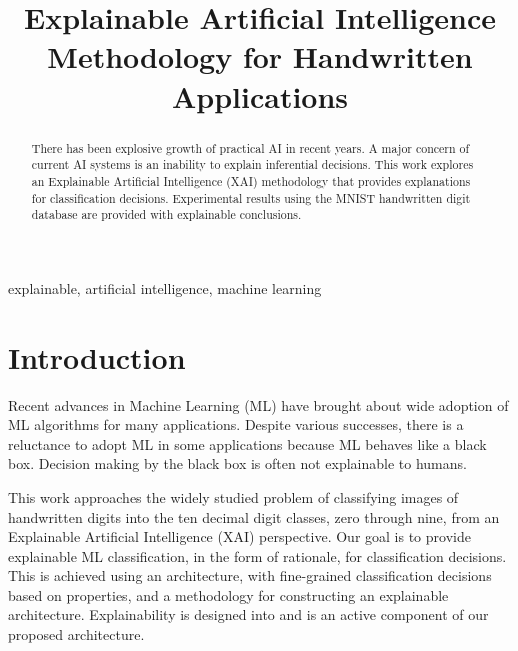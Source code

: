 \documentclass[conference]{IEEEtran}
\begin{document}
\title{Explainable Artificial Intelligence \\ {Methodology for Handwritten Applications}}

\author{

}

\maketitle

\begin{abstract}
There has been explosive growth of practical AI in recent years.
A major concern of current AI systems is an inability to explain inferential decisions.
This work explores an Explainable Artificial Intelligence (XAI) methodology that provides explanations
for classification decisions.  Experimental results using the MNIST handwritten digit database are provided with explainable conclusions.
\end{abstract}

\begin{IEEEkeywords}
explainable, artificial intelligence, machine learning
\end{IEEEkeywords}

\section{Introduction}

Recent advances in Machine Learning (ML) have brought about wide adoption of ML algorithms for many applications.  Despite various successes, there is a reluctance to adopt ML in some applications because ML behaves like a black box.  Decision making by the black box is often not explainable to humans. 

This work approaches the widely studied problem of classifying images of handwritten digits into the ten decimal digit classes, zero through nine, from an Explainable Artificial Intelligence (XAI) perspective.  Our goal is to provide explainable ML classification, in the form of rationale, for classification decisions.  This is achieved using an architecture, with fine-grained classification decisions based on properties, and a methodology for constructing an explainable architecture.  Explainability is designed into and is an active component of our proposed architecture\cite{Arrieta2020ExplainableAI}. 
\end{document}

